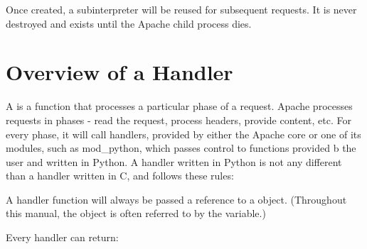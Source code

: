 Once created, a subinterpreter will be reused for subsequent requests.
It is never destroyed and exists until the Apache child process dies.

\begin{seealso}
\end{seealso}

\section{Overview of a Handler\label{pyapi-handler}}

A  is a function that processes a particular phase of a
request. Apache processes requests in phases - read the request,
process headers, provide content, etc. For every phase, it will call
handlers, provided by either the Apache core or one of its modules,
such as mod_python, which passes control to functions provided b the
user and written in Python. A handler written in Python is not any
different than a handler written in C, and follows these rules:

A handler function will always be passed a reference to a
 object. (Throughout this manual, the 
object is often referred to by the  variable.)

Every handler can return:

